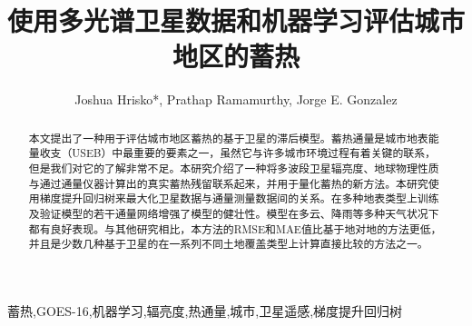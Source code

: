 \documentclass[3p,times]{elsarticle}
\begin{document}
\begin{frontmatter}



\dochead{}

\title{使用多光谱卫星数据和机器学习评估城市地区的蓄热}


\author{Joshua Hrisko*, Prathap Ramamurthy, Jorge E. Gonzalez}

\address{机械工程系和NOAA-CESSRST中心，纽约市立大学城市学院，纽约，NY 10031，美国}

\begin{abstract}
本文提出了一种用于评估城市地区蓄热的基于卫星的滞后模型。蓄热通量是城市地表能量收支（USEB）中最重要的要素之一，虽然它与许多城市环境过程有着关键的联系，但是我们对它的了解非常不足。本研究介绍了一种将多波段卫星辐亮度、地球物理性质与通过通量仪器计算出的真实蓄热残留联系起来，并用于量化蓄热的新方法。本研究使用梯度提升回归树来最大化卫星数据与通量测量数据间的关系。在多种地表类型上训练及验证模型的若干通量网络增强了模型的健壮性。模型在多云、降雨等多种天气状况下都有良好表现。与其他研究相比，本方法的RMSE和MAE值比基于地对地的方法更低，并且是少数几种基于卫星的在一系列不同土地覆盖类型上计算直接比较的方法之一。
\end{abstract}

\begin{keyword}
蓄热\sep GOES-16\sep 机器学习\sep 辐亮度\sep 热通量\sep 城市\sep 卫星遥感\sep 梯度提升回归树
\end{keyword}

\end{frontmatter}
\end{document}
